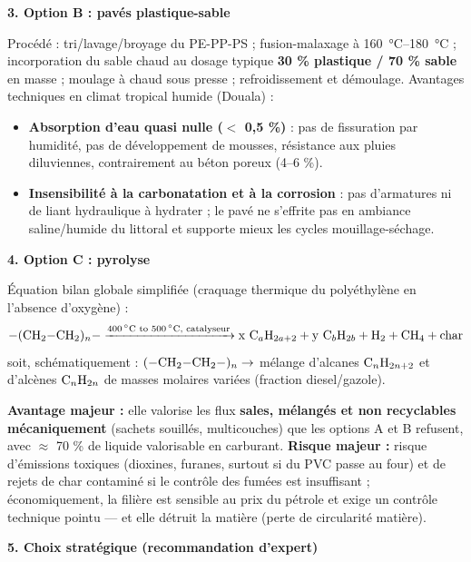 \documentclass[11pt]{article}
\begin{document}
\begin{corrige}
\textbf{3. Option B : pavés plastique-sable}

Procédé : tri/lavage/broyage du PE-PP-PS ; fusion-malaxage à \SI{160}{\celsius}--\SI{180}{\celsius} ; incorporation du sable chaud au dosage typique \textbf{30 \% plastique / 70 \% sable} en masse ; moulage à chaud sous presse ; refroidissement et démoulage. Avantages techniques en climat tropical humide (Douala) :
\begin{itemize}
    \item \textbf{Absorption d'eau quasi nulle ($<$ 0,5 \%)} : pas de fissuration par humidité, pas de développement de mousses, résistance aux pluies diluviennes, contrairement au béton poreux (4--6 \%).
    \item \textbf{Insensibilité à la carbonatation et à la corrosion} : pas d'armatures ni de liant hydraulique à hydrater ; le pavé ne s'effrite pas en ambiance saline/humide du littoral et supporte mieux les cycles mouillage-séchage.
\end{itemize}

\textbf{4. Option C : pyrolyse}

Équation bilan globale simplifiée (craquage thermique du polyéthylène en l'absence d'oxygène) :
\[ \ce{-(CH2-CH2)_{n}- ->[\text{\SIrange{400}{500}{\celsius}, catalyseur}] x\ C_{a}H_{2a+2} + y\ C_{b}H_{2b} + H2 + CH4 + char} \]
soit, schématiquement : $\ce{(-CH2-CH2-)_{n}} \to$ mélange d'alcanes $\ce{C_{n}H_{2n+2}}$ et d'alcènes $\ce{C_{n}H_{2n}}$ de masses molaires variées (fraction diesel/gazole).

\textbf{Avantage majeur :} elle valorise les flux \textbf{sales, mélangés et non recyclables mécaniquement} (sachets souillés, multicouches) que les options A et B refusent, avec $\approx$ 70 \% de liquide valorisable en carburant. \textbf{Risque majeur :} risque d'émissions toxiques (dioxines, furanes, surtout si du PVC passe au four) et de rejets de char contaminé si le contrôle des fumées est insuffisant ; économiquement, la filière est sensible au prix du pétrole et exige un contrôle technique pointu — et elle détruit la matière (perte de circularité matière).

\textbf{5. Choix stratégique (recommandation d'expert)}


\end{corrige}
\end{document}
